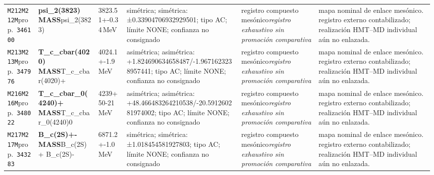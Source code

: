 \begin{landscape}
\begin{longtable}{L{1.85cm}L{4.45cm}L{2.35cm}L{4.05cm}L{3.35cm}L{7.15cm}}
\texttt{M212}\newline \texttt{M212M}\newline prop.\ \texttt{346100} & \textbf{psi\_\allowbreak{}2(3823) MASS}\newline psi\_\allowbreak{}2(3823) & 3823.51+-0.34\,MeV & simétrica; simétrica: ±0.33904706932929501; tipo AC; límite NONE; confianza no consignado & registro compuesto mesónico\newline \emph{registro exhaustivo sin promoción comparativa} & mapa nominal de enlace mesónico. registro externo contabilizado; realización HMT--MD individual aún no enlazada. \\
\texttt{M213}\newline \texttt{M213M}\newline prop.\ \texttt{347976} & \textbf{T\_\allowbreak{}c\_\allowbreak{}cbar(4020) MASS}\newline T\_\allowbreak{}c\_\allowbreak{}cbar(4020)+ & 4024.1+-1.9\,MeV & asimétrica; asimétrica: +1.824690634658487/-1.9671623238957441; tipo AC; límite NONE; confianza no consignado & registro compuesto mesónico\newline \emph{registro exhaustivo sin promoción comparativa} & mapa nominal de enlace mesónico. registro externo contabilizado; realización HMT--MD individual aún no enlazada. \\
\texttt{M216}\newline \texttt{M216M}\newline prop.\ \texttt{348022} & \textbf{T\_\allowbreak{}c\_\allowbreak{}cbar\_\allowbreak{}0(4240)+ MASS}\newline T\_\allowbreak{}c\_\allowbreak{}cbar\_\allowbreak{}0(4240)0 & 4239+50-21\,MeV & asimétrica; asimétrica: +48.466483264210538/-20.591260281974002; tipo AC; límite NONE; confianza no consignado & registro compuesto mesónico\newline \emph{registro exhaustivo sin promoción comparativa} & mapa nominal de enlace mesónico. registro externo contabilizado; realización HMT--MD individual aún no enlazada. \\
\texttt{M217}\newline \texttt{M217M}\newline prop.\ \texttt{343283} & \textbf{B\_\allowbreak{}c(2S)+- MASS}\newline B\_\allowbreak{}c(2S)+ \textbar{}\allowbreak{} B\_\allowbreak{}c(2S)- & 6871.2+-1.0\,MeV & simétrica; simétrica: ±1.018454581927803; tipo AC; límite NONE; confianza no consignado & registro compuesto mesónico\newline \emph{registro exhaustivo sin promoción comparativa} & mapa nominal de enlace mesónico. registro externo contabilizado; realización HMT--MD individual aún no enlazada. \\

\end{longtable}
\end{landscape}
